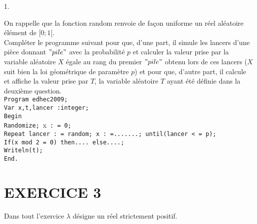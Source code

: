 \documentclass[11pt]{article}%
\begin{document}
\begin{noliste}{1.}
\item On rappelle que la fonction random renvoie de façon uniforme un
réel aléatoire élément de $[0;1[$.\\
Compléter le programme suivant pour que, d'une part, il simule les
lancers d'une pièce donnant $"pile"$ avec la probabilité $p$ et
calculer la valeur prise par la variable aléatoire $X$ égale au rang
du premier $"pile"$ obtenu lors de ces lancers ($X$ suit bien la loi
géométrique de paramètre $p$) et pour que, d'autre part, il calcule et
affiche la valeur prise par $T$, la variable aléatoire $T$ ayant été
définie dans la deuxième question.\\
\texttt{Program edhec2009;\\
Var x,t,lancer :integer;\\
Begin\\
\hspace*{1cm}Randomize; }x\texttt{ : = 0;\\
\hspace*{1cm}Repeat lancer : = random; x : =.......; until(lancer < =
p);\\
\hspace*{1cm}If(x mod 2 = 0) then.... else....;\\
\hspace*{1cm}Writeln(t);\\
End.}
\end{noliste}

\section*{EXERCICE 3}

Dans tout l'exercice $\lambda $ désigne un réel strictement positif.
\end{document}

